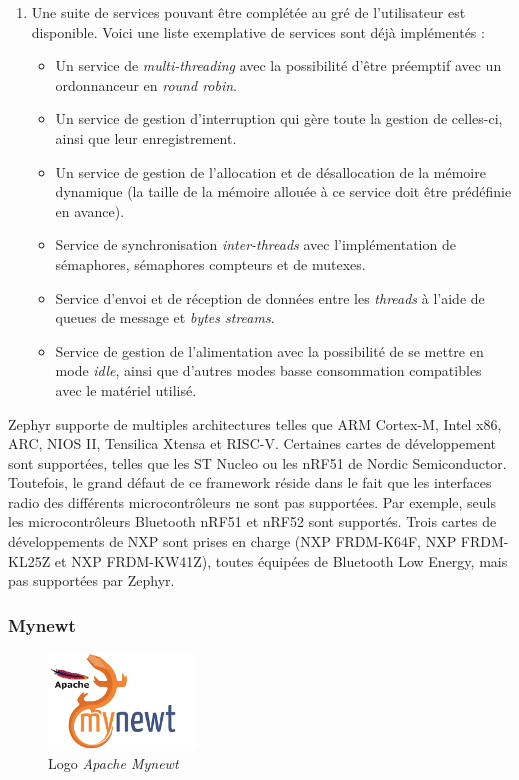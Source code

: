 \begin{enumerate}
    \item Une suite de services pouvant être complétée au gré de l'utilisateur est disponible. Voici une liste exemplative de services sont déjà implémentés : 
        \begin{itemize}
            \item Un service de \textit{multi-threading} avec la possibilité d'être préemptif avec un ordonnanceur en \textit{round robin}.
            \item Un service de gestion d'interruption qui gère toute la gestion de celles-ci, ainsi que leur enregistrement.
            \item Un service de gestion de l'allocation et de désallocation de la mémoire dynamique (la taille de la mémoire allouée à ce service doit être prédéfinie en avance).
            \item Service de synchronisation \textit{inter-threads} avec l'implémentation de sémaphores, sémaphores compteurs et de mutexes.
            \item Service d'envoi et de réception de données entre les \textit{threads} à l'aide de queues de message et \textit{bytes streams}.
            \item Service de gestion de l'alimentation avec la possibilité de se mettre en mode \textit{idle}, ainsi que d'autres modes basse consommation compatibles avec le matériel utilisé.
        \end{itemize} 
    
\end{enumerate}

Zephyr supporte de multiples architectures telles que ARM Cortex-M, Intel x86, ARC, NIOS II, Tensilica Xtensa et RISC-V. Certaines cartes de développement sont supportées, telles que les ST Nucleo ou les nRF51 de Nordic Semiconductor. Toutefois, le grand défaut de ce framework réside dans le fait que les interfaces radio des différents microcontrôleurs ne sont pas supportées. Par exemple, seuls les microcontrôleurs Bluetooth nRF51 et nRF52 sont supportés. Trois cartes de développements de NXP sont prises en charge (NXP FRDM-K64F, NXP FRDM-KL25Z et NXP FRDM-KW41Z), toutes équipées de Bluetooth Low Energy, mais pas supportées par Zephyr. 

\FloatBarrier
\subsubsection{Mynewt}

\begin{figure}[ht!]
    \centering
    \includegraphics[width=0.35\textwidth]{Figures/StateOfTheArt/mynewt_logo.png}
    \caption{Logo \textit{Apache Mynewt}}
    \label{fig:mynewt_logo}
\end{figure}

